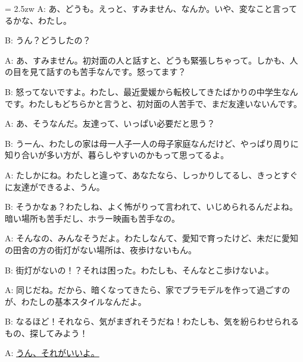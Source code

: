 \documentclass[11pt]{amsart}
\title{}
\author{}
\newenvironment{hangall}[1]{\hangindent = 2.5zw\everypar{\hangindent = 2.5zw}}{}
\begin{document}
\maketitle
\begin{hangall}{}%
A: あ、どうも。えっと、すみません、なんか。いや、変なこと言ってるかな、わたし。

B: うん？どうしたの？

A: あ、すみません。初対面の人と話すと、どうも緊張しちゃって。しかも、人の目を見て話すのも苦手なんです。怒ってます？

B: 怒ってないですよ。わたし、最近愛媛から転校してきたばかりの中学生なんです。わたしもどちらかと言うと、初対面の人苦手で、まだ友達いないんです。

A: あ、そうなんだ。友達って、いっぱい必要だと思う？

B: うーん、わたしの家は母一人子一人の母子家庭なんだけど、やっぱり周りに知り合いが多い方が、暮らしやすいのかもって思ってるよ。

A: たしかにね。わたしと違って、あなたなら、しっかりしてるし、きっとすぐに友達ができるよ、うん。

B: そうかなぁ？わたしね、よく怖がりって言われて、いじめられるんだよね。暗い場所も苦手だし、ホラー映画も苦手なの。

A: そんなの、みんなそうだよ。わたしなんて、愛知で育ったけど、未だに愛知の田舎の方の街灯がない場所は、夜歩けないもん。

B: 街灯がないの！？それは困った。わたしも、そんなとこ歩けないよ。

A: 同じだね。だから、暗くなってきたら、家でプラモデルを作って過ごすのが、わたしの基本スタイルなんだよ。

B: なるほど！それなら、気がまぎれそうだね！わたしも、気を紛らわせられるもの、探してみよう！

A: \ul{うん、それがいいよ。}\end{hangall}
\end{document}
